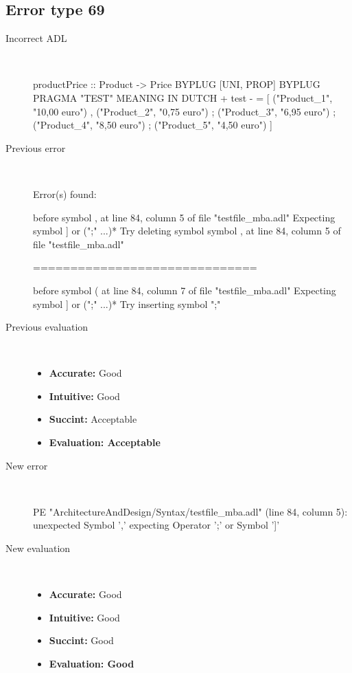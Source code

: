 \hrulefill

\subsection{Error type 69}
  \begin{description}
  \item[Incorrect ADL]~\\
\begin{adl}
productPrice :: Product -> Price BYPLUG [UNI, PROP] BYPLUG PRAGMA "TEST"
MEANING IN DUTCH  {+ test -}
  = [ ("Product_1", "10,00 euro")
    , ("Product_2", "0,75 euro")
    ; ("Product_3", "6,95 euro")
    ; ("Product_4", "8,50 euro")
    ; ("Product_5", "4,50 euro")
    ]\end{adl}
  \item[Previous error]~\\
\begin{haskell}
Error(s) found:

before symbol , at line 84, column 5 of file "testfile_mba.adl"
Expecting symbol ] or (";" ...)*
Try deleting symbol symbol , at line 84, column 5 of file "testfile_mba.adl"

==============================

before symbol ( at line 84, column 7 of file "testfile_mba.adl"
Expecting symbol ] or (";" ...)*
Try inserting symbol ";"
\end{haskell}
  \item[Previous evaluation]~\\
    \begin{itemize}
    \item \textbf{Accurate:} Good
    \item \textbf{Intuitive:} Good
    \item \textbf{Succint:} Acceptable
    \item \textbf{Evaluation: Acceptable}
    \end{itemize}
  \item[New error]~\\
\begin{haskell}
PE "ArchitectureAndDesign/Syntax/testfile_mba.adl" (line 84, column 5):
unexpected Symbol ','
expecting Operator ';' or Symbol ']'
\end{haskell}
  \item[New evaluation]~\\
    \begin{itemize}
    \item \textbf{Accurate:} Good
    \item \textbf{Intuitive:} Good
    \item \textbf{Succint:} Good
    \item \textbf{Evaluation: Good
}
    \end{itemize}
  \end{description}

